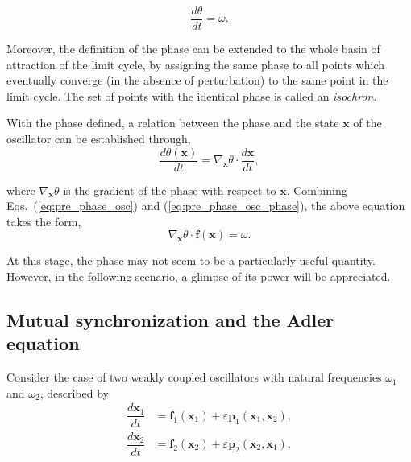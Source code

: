 \begin{equation}
    \dfrac{d\theta}{dt} = \omega.
    \label{eq:pre_phase_osc_phase}
\end{equation}

Moreover, the definition of the phase can be extended
to the whole basin of attraction of the limit cycle, by assigning the same phase to all points
which eventually converge (in the absence of perturbation) to the same point in the limit cycle.
The set of points with the identical phase is called an {\em isochron}.

With the phase defined, a relation between the phase and the state $\mathbf{x}$ of the oscillator 
can be established through,
\begin{equation*}
    \dfrac{d\theta(\mathbf{x})}{dt} = \nabla_\mathbf{x} \theta \cdot \dfrac{d\mathbf{x}}{dt},
\end{equation*}

\noindent where $\nabla_\mathbf{x} \theta$ is the gradient of the phase with respect to $\mathbf{x}$. Combining
Eqs.~(\ref{eq:pre_phase_osc}) and (\ref{eq:pre_phase_osc_phase}), the above equation takes the form,
\begin{equation}
    \nabla_\mathbf{x} \theta \cdot \mathbf{f(\mathbf{x})} = \omega.
\end{equation}


At this stage, the phase may not seem to be a particularly useful quantity. However, in the following
scenario, a glimpse of its power will be appreciated.

\subsection{Mutual synchronization and the Adler equation}

Consider the case of two weakly coupled oscillators 
with natural frequencies $\omega_1$ and $\omega_2$, described by
\begin{align}
    \dfrac{d\mathbf{x}_1}{dt} &= \mathbf{f}_1(\mathbf{x}_1) + \varepsilon \mathbf{p}_1(\mathbf{x}_1, \mathbf{x}_2), \\
    \dfrac{d\mathbf{x}_2}{dt} &= \mathbf{f}_2(\mathbf{x}_2) + \varepsilon \mathbf{p}_2(\mathbf{x}_2, \mathbf{x}_1),
\end{align}

